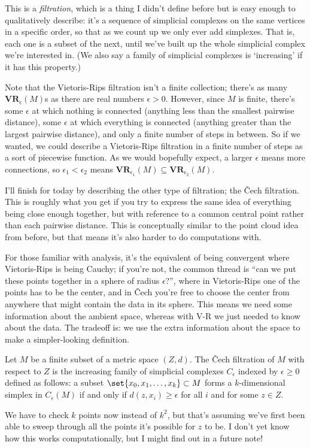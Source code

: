 \documentclass{lec}
\begin{document}
    This is a \textit{filtration}, which is a thing I didn't define before but is easy enough to qualitatively describe: it's a sequence of simplicial complexes on the same vertices in a specific order, so that as we count up we only ever add simplexes. That is, each one is a subset of the next, until we've built up the whole simplicial complex we're interested in. (We also say a family of simplicial complexes is `increasing' if it has this property.)

    Note that the Vietoris-Rips filtration isn't a finite collection; there's as many $\mathbf{VR}_\epsilon(M)$s as there are real numbers $\epsilon > 0$. However, since $M$ is finite, there's some $\epsilon$ at which nothing is connected (anything less than the smallest pairwise distance), some $\epsilon$ at which everything is connected (anything greater than the largest pairwise distance), and only a finite number of steps in between. So if we wanted, we could describe a Vietoris-Rips filtration in a finite number of steps as a sort of piecewise function. As we would bopefully expect, a larger $\epsilon$ means more connections, so $\epsilon_1 < \epsilon_2$ means $\mathbf{VR}_{\epsilon_1}(M) \subseteq \mathbf{VR}_{\epsilon_2}(M)$.

    I'll finish for today by describing the other type of filtration; the \v{C}ech filtration. This is roughly what you get if you try to express the same idea of everything being close enough together, but with reference to a common central point rather than each pairwise distance. This is conceptually similar to the point cloud idea from before, but that means it's also harder to do computations with. 
    
    For those familiar with analysis, it's the equivalent of being convergent where Vietoris-Rips is being Cauchy; if you're not, the common thread is ``can we put these points together in a sphere of radius $\epsilon$?'', where in Vietoris-Rips one of the points has to be the center, and in \v{C}ech you're free to choose the center from anywhere that might contain the data in its sphere. This means we need some information about the ambient space, whereas with V-R we just needed to know about the data. The tradeoff is: we use the extra information about the space to make a simpler-looking definition.

    \begin{definition}
        Let $M$ be a finite subset of a metric space $(Z, d)$. The \v{C}ech filtration of $M$ with respect to $Z$ is the increasing family of simplicial complexes $C_\epsilon$ indexed by $\epsilon \geq 0$ defined as follows: a subset $\set{x_0, x_1, \dots, x_k} \subset M$ forms a $k$-dimensional simplex in $C_\epsilon(M)$ if and only if $d(z, x_i) \geq \epsilon$ for all $i$ and for some $z \in Z$.
    \end{definition}

    We have to check $k$ points now instead of $k^2$, but that's assuming we've first been able to sweep through all the points it's possible for $z$ to be. I don't yet know how this works computationally, but I might find out in a future note!
\end{document}
